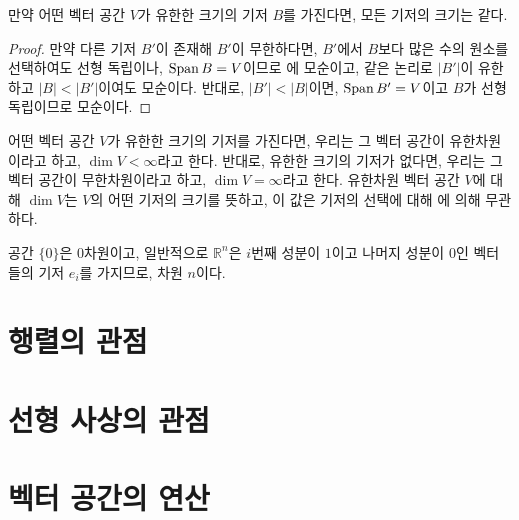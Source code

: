 \begin{corollary}
\label{cor:invariantdim}
    만약 어떤 벡터 공간 $V$가 유한한 크기의 기저 $B$를 가진다면, 모든 기저의 크기는 같다.
\end{corollary}
\begin{proof}
    만약 다른 기저 $B'$이 존재해 $B'$이 무한하다면, $B'$에서 $B$보다 많은 수의 원소를 선택하여도 선형 독립이나, $\operatorname{Span} B = V$이므로 에 모순이고, 같은 논리로 $|B'|$이 유한하고 $|B| < |B'|$이여도 모순이다.
    반대로, $|B'| < |B|$이면, $\operatorname{Span} B' = V$이고 $B$가 선형 독립이므로 모순이다.
\end{proof}

\begin{definition}
    어떤 벡터 공간 $V$가 유한한 크기의 기저를 가진다면, 우리는 그 벡터 공간이 유한차원이라고 하고, $\dim V < \infty$라고 한다.
    반대로, 유한한 크기의 기저가 없다면, 우리는 그 벡터 공간이 무한차원이라고 하고, $\dim V = \infty$라고 한다.
    유한차원 벡터 공간 $V$에 대해 $\dim V$는 $V$의 어떤 기저의 크기를 뜻하고, 이 값은 기저의 선택에 대해 에 의해 무관하다.  
\end{definition}
\begin{example}
    공간 $\{0\}$은 $0$차원이고, 일반적으로 $\mathbb{R}^n$은 $i$번째 성분이 $1$이고 나머지 성분이 $0$인 벡터들의 기저 $e_i$를 가지므로, 차원 $n$이다.
\end{example}

\section{행렬의 관점}
\begin{definition}\label{def:determinant}

\end{definition}
\section{선형 사상의 관점}

\section{벡터 공간의 연산}

\begin{definition}
\label{def:dirprodvec}
\end{definition}

\begin{definition}
\label{def:tenprodvec}
\end{definition}


